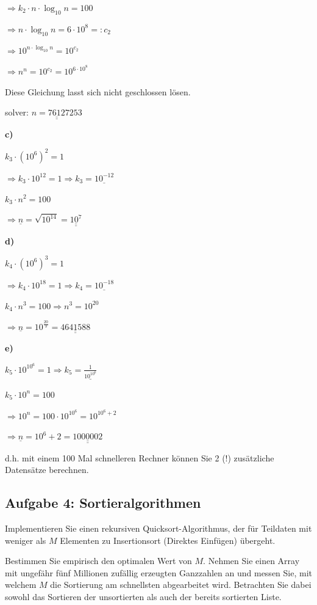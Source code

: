 $ \Rightarrow k_2 \cdot n \cdot \log_{10} n = 100$

$ \Rightarrow n \cdot \log_{10} n = 6 \cdot 10^8 =: c_2 $

$\Rightarrow 10^{n \cdot \log_{10} n} = 10^{c_2}$

$\Rightarrow n^n = 10^{c_2} = 10^{6\cdot10^8}$

Diese Gleichung lasst sich nicht geschlossen lösen.

solver: $\underline{\underline{n= 76 127 253}}$

\noindent
\textbf{c)}
\medskip

$ k_3 \cdot (10^6)^2 = 1 $

$\Rightarrow k_3 \cdot 10^12 = 1 \Rightarrow k_3 = \underline{10^{-12}}$

$k_3 \cdot n^2 = 100$

$\Rightarrow \underline{n} = \sqrt{10^{14}} = \underline{\underline{10^7}}$

\noindent
\textbf{d)}
\medskip

$ k_4\cdot (10^6)^3 = 1$

$\Rightarrow k_4 \cdot 10^{18} =1 \Rightarrow k_4 = \underline{10^{-18}}$

$k_4 \cdot n^3 = 100 \Rightarrow n^3 = 10^{20}$

$\Rightarrow \underline{n} = 10^{\frac{20}{3}} = \underline{\underline{4641588}}$

\noindent
\textbf{e)}
\medskip

$ k_5 \cdot 10^{10^6} = 1 \Rightarrow k_5 = \underline{\frac{1}{10^{10^6}}}$

$ k_5 \cdot 10^{n} = 100$

$ \Rightarrow 10^n = 100 \cdot  10^{10^6} =  10^{10^6+2}$

$\Rightarrow \underline{n} = 10^{6} + 2 = \underline{\underline{1000002}}$

d.h. mit einem 100 Mal schnelleren Rechner können Sie 2 (!) zusätzliche Datensätze berechnen.

\subsection{Aufgabe 4: Sortieralgorithmen}
Implementieren Sie einen rekursiven Quicksort-Algorithmus, der für Teildaten mit weniger als $M$ Elementen
zu Insertionsort (Direktes Einfügen) übergeht.

Bestimmen Sie empirisch den optimalen Wert von $M$. Nehmen Sie einen Array mit ungefähr fünf Millionen
zufällig erzeugten Ganzzahlen an und messen Sie, mit welchem $M$ die Sortierung am schnellsten abgearbeitet
wird. Betrachten Sie dabei sowohl das Sortieren der unsortierten als auch der bereits sortierten Liste.



